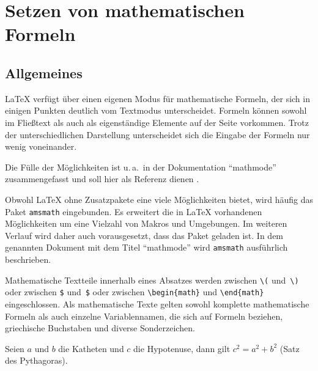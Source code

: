 

\section{Setzen von mathematischen Formeln} \label{math}


\subsection{Allgemeines}

\LaTeX{} verfügt über einen eigenen Modus für mathematische Formeln, der sich
in einigen Punkten deutlich vom Textmodus unterscheidet. Formeln können sowohl
im Fließtext als auch als eigenständige Elemente auf der Seite vorkommen.
Trotz der unterschiedlichen Darstellung  unterscheidet sich die Eingabe der
Formeln nur wenig voneinander.

Die Fülle der Möglichkeiten ist u.\,a.\ in der Dokumentation \enquote{mathmode}
zusammengefasst und soll hier als Referenz dienen \cite{mathmode}.

Obwohl \LaTeX{} ohne Zusatzpakete eine viele Möglichkeiten bietet, wird häufig
das Paket \texttt{amsmath} eingebunden. Es erweitert die in \LaTeX{}
vorhandenen Möglichkeiten  um eine Vielzahl von Makros und Umgebungen. Im
weiteren Verlauf wird daher auch vorausgesetzt, dass das Paket geladen ist. In
dem genannten Dokument mit dem Titel \enquote{mathmode} wird \texttt{amsmath}
ausführlich beschrieben.
 
Mathematische Textteile innerhalb eines Absatzes werden zwischen
\lstinline|\(| und~\lstinline|\)| oder zwischen \lstinline|$| und~\lstinline|$| oder
zwischen \lstinline|\begin{math}| und \lstinline|\end{math}|
eingeschlossen.
Als mathematische Texte gelten sowohl komplette mathematische
Formeln als auch einzelne Variablennamen, die sich auf Formeln
beziehen, griechische Buchstaben und diverse Sonderzeichen.

\begin{LTXexample}
Seien $a$ und $b$ die Katheten
und $c$ die Hypotenuse,
dann gilt $c^{2}=a^{2}+b^{2}$
(Satz des Pythagoras).
\end{LTXexample}

